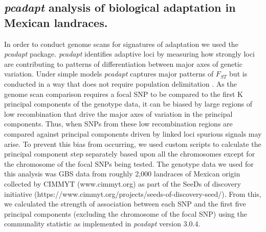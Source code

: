 \documentclass[9pt,twocolumn,twoside,lineno]{biorxiv}
\begin{document}
\subsection{\textit{pcadapt} analysis of biological adaptation in Mexican landraces.}
In order to conduct genome scans for signatures of adaptation we used the \textit{pcadapt} \cite{Luu2017-ws} package.
\textit{pcadapt} identifies adaptive loci by measuring how strongly loci are contributing to patterns of differentiation between major axes of genetic variation.
Under simple models \textit{pcadapt} captures major patterns of $F_{ST}$  but is conducted in a way that does not require population delimitation \cite{duforet2014genome}.
As the genome scan comparison requires a focal SNP to be compared to the first K principal components of the genotype data, it can be biased by large regions of low recombination that drive the major axes of variation in the principal components.
Thus, when SNPs from these low recombination regions are compared against principal components driven by linked loci spurious signals may arise.
To prevent this bias from occurring, we used custom scripts to calculate the principal component step separately based upon all the chromosomes except for the chromosome of the focal SNPs being tested.
The genotype data we used for this analysis was GBS data from roughly 2,000 landraces of Mexican origin collected by CIMMYT (www.cimmyt.org) as part of the SeeDs of discovery initiative (https://www.cimmyt.org/projects/seeds-of-discovery-seed/).
From this, we calculated the strength of association between each SNP and the first five principal components (excluding the chromosome of the focal SNP) using the communality statistic as implemented in \textit{pcadapt} version 3.0.4.
\end{document}
